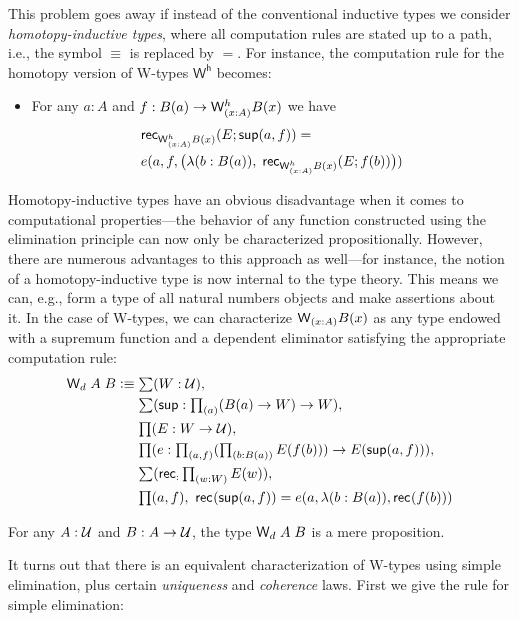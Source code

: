 This problem goes away if instead of the conventional inductive types we consider \emph{homotopy-inductive types}, where all computation rules are stated up to a path, i.e., the symbol $\equiv$ is replaced by $=$. For instance, the computation rule for the homotopy version of W-types $\mathsf{W^h}$ becomes:
\begin{itemize}
\item For any $a : A$ and $f : B(a) \to \wtypeh{x:A} B(x)$ we have 
\begin{align*}
& \rec{\wtypeh{x:A} B(x)}(E;\supp(a,f)) = \\ & e(a,f,\big(\lambda (b : B(a)), \; \rec{\wtypeh{x:A} B(x)}(E;f(b))\big))
\end{align*}
\end{itemize}

Homotopy-inductive types have an obvious disadvantage when it comes to computational properties---the behavior of any function constructed using the elimination principle can now only be characterized propositionally. However, there are numerous advantages to this approach as well---for instance, the notion of a homotopy-inductive type is now internal to the type theory. This means we can, e.g., form a type of all natural numbers objects and make assertions about it. In the case of W-types, we can characterize $\wtype{x:A} B(x)$ as any type endowed with a supremum function and a dependent eliminator satisfying the appropriate computation rule:
\begin{align*}
\w_d \; A \; B \defeq & \; \sm{W : \type} \\
                      & \; \sm{\supp : \prd {a} (B(a) \to W) \to W} \\
                      & \; \prd{E : W \to \type} \\
                      & \; \prd{e : \prd{a,f} (\prd{b : B(a)} E(f(b))) \to E(\supp(a,f))} \\
                      & \; \sm{\rec : \prd{w : W} E(w)} \\
                      & \; \prd{a,f} \rec{}(\supp(a,f)) = e(a,\lambda (b: B(a)), \rec{}(f(b)))
\end{align*}

\begin{thm}
For any $A : \mathcal{U}$ and $B : A \to \mathcal{U}$, the type $\mathsf{W}_d \; A \; B$ is a mere proposition.
\end{thm}

It turns out that there is an equivalent characterization of W-types using simple elimination, plus certain \emph{uniqueness} and \emph{coherence} laws. First we give the rule for simple elimination:

